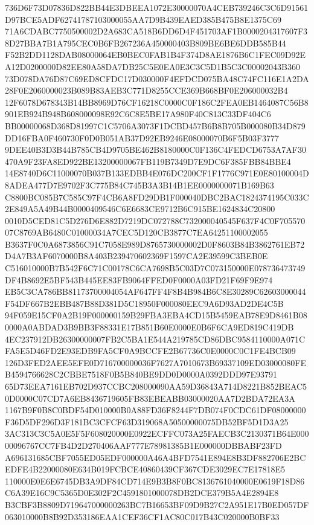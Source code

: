\documentclass[UTF8,fontset=fandol,zihao=-4,a4paper]{ctexart}
\begin{document}
{{736D6F73D07836D822BB44E3DBEEA1072E30000070A4CEB739246C3C6D91561D97BCE5ADF62741787103000055AA7D9B439EAED385B475B8E1375C69
71A6CDABC7750500002D2A683CA518B6DD6D4F451703AF1B0000204317607F38D27BBA7B1A795CEC0B6FB267236A450000403B809BE6BE6DDB585B44
F52B2DD1128DAB08000064EB0BEC0FAB1B4F374D8AE1876B6C1FEC09D92EA12D0200000D82EE80A58DA7DB25C5E0EA0E3C3C5D1B5C3C00002043B360
73D078DA76D87C69ED8CFDC17D030000F4EFDCD075BA48C74FC116E1A2DA28F0E2060000023B089B83AEB3C771D8255CCE369B668BF0E206000032B4
12F6078D678343B14BB8969D76CF16218C0000C0F186C2FEA0EB1464087C56B8901EB924B948B608000098E92C6C8E5BE17A980F40C813C33DF404C6
BB00000068D368D81997C1C5706A3073F1DCBD457B6B8B705B000080B34D879DD16FBA0F460730F0D0B051AB37D92EB9246E08000070B6F5B03F3777
9DEE40B3D3B44B785CB4D9705BE462B8180000C0F136C4FEDCD6753A7AF30470A9F23FA8ED922BE13200000067FB119B7349D7E9DC6F385FBB84BBE4
14E8740D6C11000070B037B133EDBB4E076DC200CF1F1776C971E0E80100004D8ADEA477D7E9702F3C775B84C745B3A3B14B1EE0000000071B169B63
C8800BC085B7C585C97F4CB6A8FD29DB1F000040DBC2BAC1824374195C033C2E849A5A49B44B0000409546C6E6683CE9712B6C915BE1624834C20800
0010D5CED81C5D276D6E882D7219DC072788C732000040545F637F4C0F70557007C8769AB6480C01000034A7CEC5D120CB3877C7EA64251100002055
B3637F0C0A6873856C91C7058E989D8765730000002D0F8603B84B3862761EB72D4A7B3AF6070000B8A403B239470602369F1597CA2E39599C3BEB0E
C516010000B7B542F6C71C00178C6CA7698B5C03D7C073150000E078736473749DF4B8692E5BF543B445EE83FB9064FFED0F0000A03FD21F69F9E974
EB5C3CA786BB81173700004054AF647FF4F8B4B984B6C8E30289C62603000044F54DF667B2EBB487B88D381D5C18950F000080EEC9A6D93AD2DE4C5B
94F059E15CF0A2B19F000000159B29FBA3EBA4CD15B5459EAB78E9D8461B080000A0ABDAD3B9BB3F88331E17B851B60E0000E0B6F6CA9ED819C419DB
4EC237912DB26300000007FB2C5BA1E544A219785CD86DBC9584110000A071CFA5E5D46FD2E93EDB9FA5CF0A9BCCFE2B67736C0E0000C0C1FE4BCB09
126D3FED2AEE5EFE0D716700000036F7627A7010673B69337109ED03000080FEB4594766628C2CBBE7518F0B5B840BE9DD0D0000A0392DDD97E93791
65D73EEA7161EB702D937CCBC208000090AA59D36843A714D8221B852BEAC50D0000C07CD7A6EB8436719605FB83EBEABB03000020AA7D2BDA72EA3A
1167B9F0B8C0BDF54D010000B0A88FD36F8244F7DB074F0CDC61DF08000000F36D5DF296D3F181BC3CFCF63D319068A50500000075DB52BF5D1D3A25
3AC313C3C5A0E5F5F608020000E0922ECFFC073A25FAECB3C2130371B64E00000096767CC7FB4D2D270406AAF777E78981385B1E000000DBBABF23FD
A696131685CBF7055ED05EDF000000A46A4BFD7541E894E8B3DF882706E2BCEDFE4B22000080E634B019FCBCE40860439CF367CDE3029EC7E17818E5
110000E0E6E6745DB3A9DF84CD714E9B3B8F0BC8136761040000E0619F18D86C6A39E16C9C5365D0E302F2C4591801000078DB2DCE379B5A4E2894E8
B3CBF3B8809D719647000000263BC7B16653BF09D9B27C2A951E17B0ED057DF063010000B8B92D353186EAA1CEF36CF1AC80C017B43C020000B0BF33
}}
\end{document}
